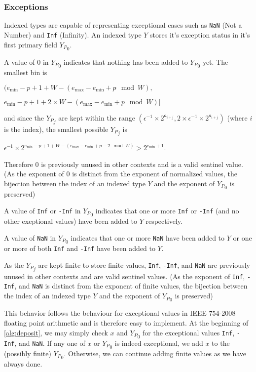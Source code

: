 \documentclass[12pt]{article}
\providecommand{\min}{\ensuremath{\text{min}}}
\providecommand{\max}{\ensuremath{\text{max}}}
\theoremstyle{plain}
\begin{document}
    \subsubsection{Exceptions}
      Indexed types are capable of representing exceptional cases such as \verb|NaN| (Not a Number) and \verb|Inf| (Infinity). An indexed type $Y$ stores it's exception status in it's first primary field ${Y_P}_0$.

      A value of $0$ in ${Y_P}_0$ indicates that nothing has been added to ${Y_P}_0$ yet. The smallest bin is

      $(e_{\min} - p + 1 + W - (e_{\max} - e_{\min} + p \mod W),$

      \indent \indent $e_{\min} - p + 1 + 2 \times W - (e_{\max} - e_{\min} + p \mod W)]$

      and since the ${Y_P}_j$ are kept within the range $(\epsilon^{-1} \times 2^{a_{i + j}}, 2 \times \epsilon^{-1} \times 2^{a_{i + j}})$ (where $i$ is the index), the smallest possible ${Y_P}_j$ is

      $\epsilon^{-1} \times 2^{e_{\min} - p + 1 + W - (e_{\max} - e_{\min} + p - 2 \mod W)} > 2^{e_{\min} + 1}$.

      Therefore $0$ is previously unused in other contexts and is a valid sentinel value. (As the exponent of $0$ is distinct from the exponent of normalized values, the bijection between the index of an indexed type $Y$ and the exponent of ${Y_P}_0$ is preserved)

      A value of \verb|Inf| or \verb|-Inf| in ${Y_P}_0$ indicates that one or more \verb|Inf| or \verb|-Inf| (and no other exeptional values) have been added to $Y$ respectively.

      A value of \verb|NaN| in ${Y_P}_0$ indicates that one or more \verb|NaN| have been added to $Y$ or one or more of both \verb|Inf| and \verb|-Inf| have been added to $Y$.

      As the ${Y_P}_j$ are kept finite to store finite values, \verb|Inf|, \verb|-Inf|, and \verb|NaN| are previously unused in other contexts and are valid sentinel values. (As the exponent of \verb|Inf|, \verb|-Inf|, and \verb|NaN| is distinct from the exponent of finite values, the bijection between the index of an indexed type $Y$ and the exponent of ${Y_P}_0$ is preserved)

      This behavior follows the behaviour for exceptional values in IEEE 754-2008 floating point arithmetic and is therefore easy to implement. At the beginning of \ref{alg:deposit}, we may simply check $x$ and ${Y_P}_0$ for the exceptional values \verb|Inf|, \verb|-Inf|, and \verb|NaN|. If any one of $x$ or ${Y_P}_0$ is indeed exceptional, we add $x$ to the (possibly finite) ${Y_P}_0$. Otherwise, we can continue adding finite values as we have always done.
\end{document}
